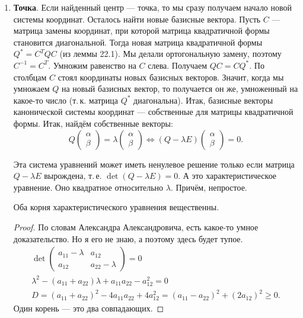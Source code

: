 \begin{enumerate}
    \item \textbf{Точка}. Если найденный центр --- точка, то мы сразу получаем начало новой системы координат. Осталось найти новые базисные вектора. Пусть $C$ --- матрица замены координат, при которой матрица квадратичной формы становится диагональной. Тогда новая матрица квадратичной формы $Q^\ast = C^TQC$ (из леммы 22.1). Мы делали ортогональную замену, поэтому $C^{-1} = C^T$. Умножим равенство на $C$ слева. Получаем $QC = CQ^\ast$. По столбцам $C$ стоял координаты новых базисных векторов. Значит, когда мы умножаем $Q$ на новый базисных вектор, то получается он же, умноженный на какое-то число (т.\,к. матрица $Q^\ast$ диагональна). Итак, базисные векторы канонической системы координат --- собственные для матрицы квадратичной формы. Итак, найдём собственные векторы:
        $$
        Q
        \begin{pmatrix}
            \alpha\\\beta
        \end{pmatrix} = \lambda
        \begin{pmatrix}
            \alpha\\\beta
        \end{pmatrix} \Leftrightarrow
        (Q - \lambda E)
        \begin{pmatrix}
            \alpha\\\beta
        \end{pmatrix} = 0.
        $$

        Эта система уравнений может иметь ненулевое решение только если матрица $Q - \lambda E$ вырождена, т.\,е. $\det(Q - \lambda E) = 0$. А это характеристическое уравнение. Оно квадратное относительно $\lambda$. Причём, непростое.
        \begin{lemma}
            Оба корня характеристического уравнения вещественны.
        \end{lemma}
        \begin{proof}
            По словам Александра Александровича, есть какое-то умное доказательство. Но я его не знаю, а поэтому здесь будет тупое.
            $$
            \begin{array}{c}
                \det
                \begin{pmatrix}
                    a_{11} - \lambda & a_{12}\\
                    a_{12} & a_{22} - \lambda
                \end{pmatrix} = 0\\
                \lambda^2 - (a_{11} + a_{22})\lambda + a_{11}a_{22} - a_{12}^2 = 0\\
                D = (a_{11} + a_{22})^2 - 4a_{11}a_{22} + 4a_{12}^2 = (a_{11} - a_{22})^2 + (2a_{12})^2 \geqslant 0.
            \end{array}
            $$
            Один корень --- это два совпадающих.
        \end{proof}


\end{enumerate}
